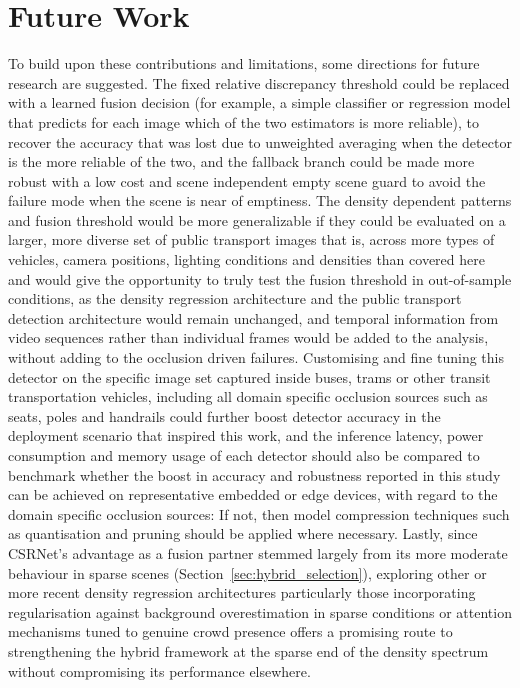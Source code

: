\section{Future Work}
\label{sec:conclusion_future_work}
To build upon these contributions and limitations, some directions for future research are suggested. The fixed relative discrepancy threshold could be replaced with a learned fusion decision (for example, a simple classifier or regression model that predicts for each image which of the two estimators is more reliable), to recover the accuracy that was lost due to unweighted averaging when the detector is the more reliable of the two, and the fallback branch could be made more robust with a low cost and scene independent empty scene guard to avoid the failure mode when the scene is near of emptiness. The density dependent patterns and fusion threshold would be more generalizable if they could be evaluated on a larger, more diverse set of public transport images that is, across more types of vehicles, camera positions, lighting conditions and densities than covered here and would give the opportunity to truly test the fusion threshold in out-of-sample conditions, as the density regression architecture and the public transport detection architecture would remain unchanged, and temporal information from video sequences rather than individual frames would be added to the analysis, without adding to the occlusion driven failures. Customising and fine tuning this detector on the specific image set captured inside buses, trams or other transit transportation vehicles, including all domain specific occlusion sources such as seats, poles and handrails could further boost detector accuracy in the deployment scenario that inspired this work, and the inference latency, power consumption and memory usage of each detector should also be compared to benchmark whether the boost in accuracy and robustness reported in this study can be achieved on representative embedded or edge devices, with regard to the domain specific occlusion sources: If not, then model compression techniques such as quantisation and pruning should be applied where necessary. Lastly, since CSRNet's advantage as a fusion partner stemmed largely from its more moderate behaviour in sparse scenes (Section~\ref{sec:hybrid_selection}), exploring other or more recent density regression architectures particularly those incorporating regularisation against background overestimation in sparse conditions or attention mechanisms tuned to genuine crowd presence offers a promising route to strengthening the hybrid framework at the sparse end of the density spectrum without compromising its performance elsewhere.